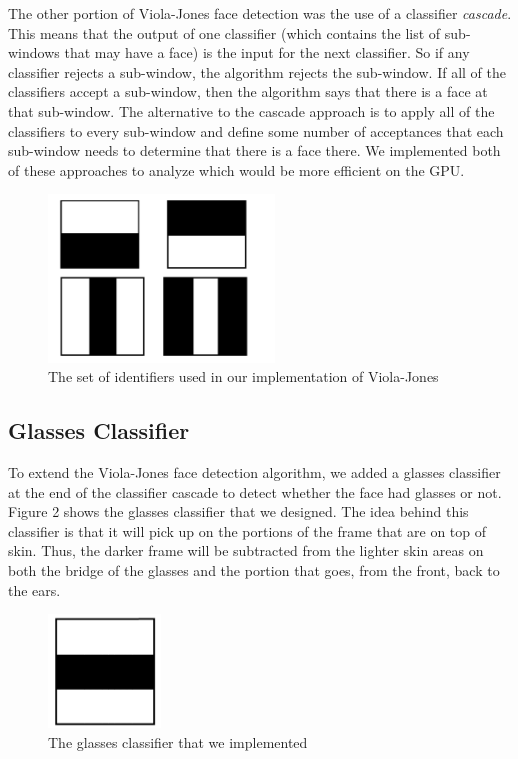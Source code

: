 \documentclass[12pt] {article}
\begin{document}
The other portion of Viola-Jones face detection was the use of a classifier \emph{cascade}. This means that the output of one classifier (which contains the list of sub-windows that may have a face) is the input for the next classifier. So if any classifier rejects a sub-window, the algorithm rejects the sub-window. If all of the classifiers accept a sub-window, then the algorithm says that there is a face at that sub-window. The alternative to the cascade approach is to apply all of the classifiers to every sub-window and define some number of acceptances that each sub-window needs to determine that there is a face there. We implemented both of these approaches to analyze which would be more efficient on the GPU.
\begin{figure}[h!]
	\centering
		\includegraphics[width=60mm]{classifiers.pdf}
		\caption{The set of identifiers used in our implementation of Viola-Jones}
\end{figure}


\subsection{Glasses Classifier}
To extend the Viola-Jones face detection algorithm, we added a glasses classifier at the end of the classifier cascade to detect whether the face had glasses or not. Figure 2 shows the glasses classifier that we designed. The idea behind this classifier is that it will pick up on the portions of the frame that are on top of skin. Thus, the darker frame will be subtracted from the lighter skin areas on both the bridge of the glasses and the portion that goes, from the front, back to the ears.
\begin{figure}[h!]
	\centering
		\includegraphics[width=30mm]{glasses_identifier.pdf}
		\caption{The glasses classifier that we implemented}
\end{figure}
\end{document}
